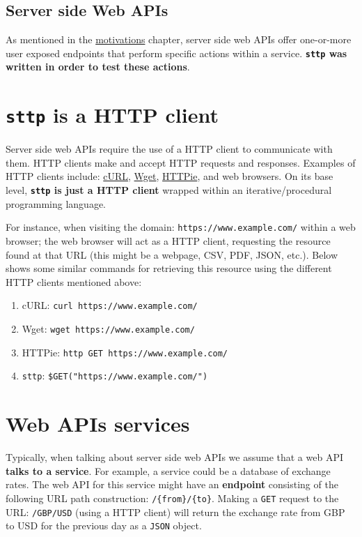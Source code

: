 \documentclass[]{full}
\theoremstyle{definition}
\begin{document}
\subsection{Server side Web APIs}

As mentioned in the \hyperref[chap:motivations]{motivations} chapter, server side web APIs offer one-or-more user exposed endpoints that perform specific actions within a service. \cprotect\textbf{\verb|sttp| was written in order to test these actions}.

\cprotect\section{\verb|sttp| is a HTTP client}
\label{sec:meet-sttp-http-clients}

Server side web APIs require the use of a HTTP client to communicate with them. HTTP clients make and accept HTTP requests and responses. Examples of HTTP clients include: \href{https://github.com/curl/curl}{cURL}, \href{https://www.gnu.org/software/wget/}{Wget}, \href{https://httpie.io/}{HTTPie}, and web browsers. On its base level, \cprotect\textbf{\verb|sttp| is just a HTTP client} wrapped within an iterative/procedural programming language.

For instance, when visiting the domain: \verb|https://www.example.com/| within a web browser; the web browser will act as a HTTP client, requesting the resource found at that URL (this might be a webpage, CSV, PDF, JSON, etc.). Below shows some similar commands for retrieving this resource using the different HTTP clients mentioned above:

\begin{enumerate}
    \item cURL: \texttt{curl https://www.example.com/}
    \item Wget: \texttt{wget https://www.example.com/}
    \item HTTPie: \texttt{http GET https://www.example.com/}
    \item \verb|sttp|: \verb|$GET("https://www.example.com/")|
\end{enumerate}

\section{Web APIs services}

Typically, when talking about server side web APIs we assume that a web API \textbf{talks to a service}. For example, a service could be a database of exchange rates. The web API for this service might have an \textbf{endpoint} consisting of the following URL path construction: \verb|/{from}/{to}|. Making a \verb|GET| request to the URL: \verb|/GBP/USD| (using a HTTP client) will return the exchange rate from GBP to USD for the previous day as a \verb|JSON| object.
\end{document}
